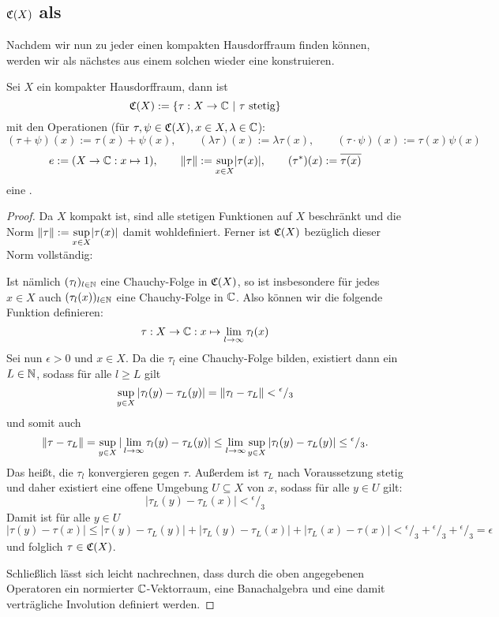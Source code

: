 \subsection{$\mathfrak{C}(X)$ als \CAlg}\label{sec:CX}

Nachdem wir nun zu jeder \CAlg{} einen kompakten Hausdorffraum finden können, werden wir als nächstes aus einem solchen wieder eine \CAlg{} konstruieren.

\begin{lemma}\label{lemma:CX}
Sei $X$ ein kompakter Hausdorffraum, dann ist
\[\mathfrak{C}(X) := \{\tau:X \to \mathbb{C} ~|~ \tau \text{ stetig}\}\]
mit den Operationen (für $\tau,\psi \in \mathfrak{C}(X), x \in X, \lambda \in \mathbb{C}$):
\[(\tau+\psi)(x) := \tau(x)+\psi(x),\qquad (\lambda\tau)(x) := \lambda \tau(x),\qquad (\tau\cdot \psi)(x) := \tau(x)\psi(x)\]
\[e := (X \to \mathbb{C}: x \mapsto 1) ,\qquad \left\lVert\tau\right\rVert := \underset{x \in X}{\sup}|\tau(x)| ,\qquad (\tau^*)(x) := \overline{\tau(x)}\]
eine \CAlg.
\end{lemma}

\begin{proof}
Da $X$ kompakt ist, sind alle stetigen Funktionen auf $X$ beschränkt und die Norm $\left\lVert\tau\right\rVert := \underset{x \in X}{\sup}|\tau(x)|$ damit wohldefiniert. Ferner ist $\mathfrak{C}(X)$ bezüglich dieser Norm vollständig:

Ist nämlich $(\tau_l)_{l \in \mathbb{N}}$ eine Chauchy-Folge in $\mathfrak{C}(X)$, so ist insbesondere für jedes $x \in X$ auch $(\tau_l(x))_{l \in \mathbb{N}}$ eine Chauchy-Folge in $\mathbb{C}$. Also können wir die folgende Funktion definieren:
	\[\tau: X \to \mathbb{C}: x \mapsto \lim_{l\to\infty}\tau_l(x)\]
Sei nun $\epsilon > 0$ und $x \in X$. Da die $\tau_l$ eine Chauchy-Folge bilden, existiert dann ein $L \in \mathbb{N}$, sodass für alle $l \geq L$ gilt
	\[\sup_{y \in X}|\tau_l(y) - \tau_L(y)| = \left\lVert\tau_l - \tau_L\right\rVert < {}^\epsilon/_3\]
und somit auch
	\[\left\lVert\tau - \tau_L\right\rVert = \sup_{y \in X}|\lim_{l\to\infty}\tau_l(y) - \tau_L(y)| \leq \lim_{l\to\infty}\sup_{y \in X}|\tau_l(y) - \tau_L(y)| \leq {}^\epsilon/_3.\]
Das heißt, die $\tau_l$ konvergieren gegen $\tau$. Außerdem ist $\tau_L$ nach Voraussetzung stetig und daher existiert eine offene Umgebung $U \subseteq X$ von $x$, sodass für alle $y \in U$ gilt:
	\[|\tau_L(y) - \tau_L(x)| < {}^\epsilon/_3\]
Damit ist für alle $y \in U$
	\[|\tau(y) - \tau(x)| \leq |\tau(y) - \tau_L(y)| + |\tau_L(y) - \tau_L(x)| + |\tau_L(x) - \tau(x)| < {}^\epsilon/_3 + {}^\epsilon/_3 + {}^\epsilon/_3 = \epsilon\]
und folglich $\tau \in \mathfrak{C}(X)$.

Schließlich lässt sich leicht nachrechnen, dass durch die oben angegebenen Operatoren ein normierter $\mathbb{C}$-Vektorraum, eine Banachalgebra und eine damit verträgliche Involution definiert werden.
\end{proof}